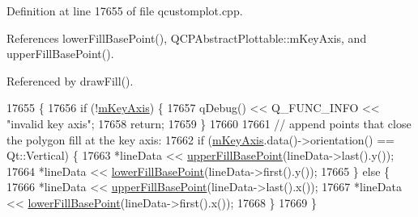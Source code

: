Definition at line 17655 of file qcustomplot.\+cpp.



References lower\+Fill\+Base\+Point(), Q\+C\+P\+Abstract\+Plottable\+::m\+Key\+Axis, and upper\+Fill\+Base\+Point().



Referenced by draw\+Fill().


\begin{DoxyCode}
17655                                                                  \{
17656   \textcolor{keywordflow}{if} (!\hyperlink{class_q_c_p_abstract_plottable_a426f42e254d0f8ce5436a868c61a6827}{mKeyAxis}) \{
17657     qDebug() << Q\_FUNC\_INFO << \textcolor{stringliteral}{"invalid key axis"};
17658     \textcolor{keywordflow}{return};
17659   \}
17660 
17661   \textcolor{comment}{// append points that close the polygon fill at the key axis:}
17662   \textcolor{keywordflow}{if} (\hyperlink{class_q_c_p_abstract_plottable_a426f42e254d0f8ce5436a868c61a6827}{mKeyAxis}.data()->orientation() == Qt::Vertical) \{
17663     *lineData << \hyperlink{class_q_c_p_graph_a363d066c179e0f46cc93c12bafb0bfba}{upperFillBasePoint}(lineData->last().y());
17664     *lineData << \hyperlink{class_q_c_p_graph_a41f982e8ceaefe6a53eb7432f26d64b6}{lowerFillBasePoint}(lineData->first().y());
17665   \} \textcolor{keywordflow}{else} \{
17666     *lineData << \hyperlink{class_q_c_p_graph_a363d066c179e0f46cc93c12bafb0bfba}{upperFillBasePoint}(lineData->last().x());
17667     *lineData << \hyperlink{class_q_c_p_graph_a41f982e8ceaefe6a53eb7432f26d64b6}{lowerFillBasePoint}(lineData->first().x());
17668   \}
17669 \}
\end{DoxyCode}


